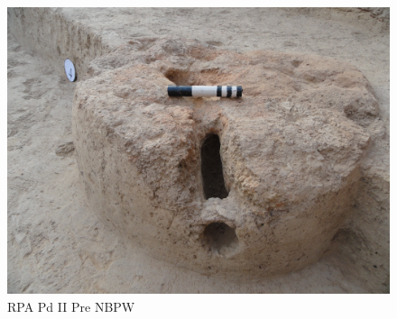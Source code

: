 \begin{figure}[H]
\setcounter{figure}{7}
\includegraphics[scale=0.4]{images/chapter-4/fig008.jpg}
\caption{RPA Pd II Pre NBPW}\label{chapter-4-fig8}
\end{figure}

